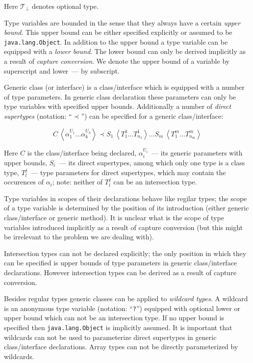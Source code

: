 \documentclass{article}
\newcommand{\grc}[2]{{#1}\,\left<{#2}\right>}
\newcommand{\java}[1]{\texttt{#1}}
\begin{document}
Here $\mathscr{T}_\bot$ denotes optional type.

Type variables are bounded in the sense that they always have a certain \emph{upper bound}. This upper
bound can be either specified explicitly or assumed to be \java{java.lang.Object}. In addition
to the upper bound a type variable can be equipped with a \emph{lower bound}. The lower bound can only
be derived implicitly as a result of \emph{capture conversion}. We denote the upper bound of a variable
by  superscript and lower~--- by subscript.

Generic class (or interface) is a class/interface which is equipped with a number of
type parameters. In generic class declaration these parameters can only be type
variables with specified upper bounds. Additionally a number of \emph{direct supertypes} (notation: ``$\prec$'')
can be specified for a generic class/interface:

\[
\grc{C}{\alpha_1^{U_1}\dots \alpha_k^{U_k}}\prec\grc{S_1}{T^1_1\dots T^1_{n_1}}\dots\grc{S_m}{T^m_1\dots T^m_{n_m}}
\]

Here $C$ is the class/interface being declared, $\alpha_i^{U_i}$~--- its generic parameters with upper
bounds, $S_i$~--- its direct supertypes, among which only one type is a class type, $T^j_l$~--- type
parameters for direct supertypes, which may contain the occurences of $\alpha_i$; note: neither of $T^j_l$ can be
an intersection type.

Type variables in scopes of their declarations behave like regilar types; the scope of a type variable is
determined by the position of its introduction (either generic class/interface or generic method). It
is unclear what is the scope of type variables introduced implicitly as a result of capture
conversion (but this might be irrelevant to the problem we are dealing with).

Intersection types can not be declared explicitly; the only position in which they can be specified is
upper bounds of type parameters in generic class/interface declarations. However intersection types can be derived
as a result of capture conversion.

Besides regular types generic classes can be applied to \emph{wildcard types}. A wildcard is an anonymous
type variable (notation: ``\java{?}'') equipped with optional lower or upper bound which can not be an intersection type.
If no upper bound is specified then \java{java.lang.Object} is implicitly assumed. It is important that wildcards can not 
be used to parameterize direct supertypes in generic class/interface declarations. Array types can not be directly
parameterized by wildcards.
\end{document}

